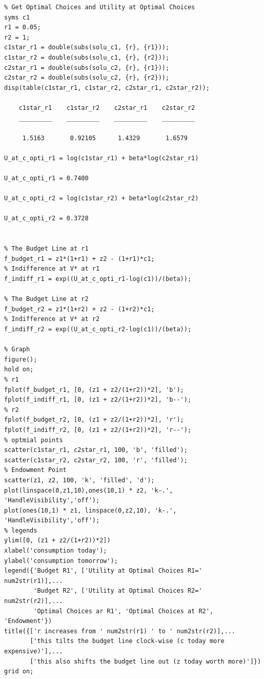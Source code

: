 \documentclass[
]{book}
\begin{document}
\begin{verbatim}
% Get Optimal Choices and Utility at Optimal Choices
syms c1
r1 = 0.05;
r2 = 1;
c1star_r1 = double(subs(solu_c1, {r}, {r1}));
c1star_r2 = double(subs(solu_c1, {r}, {r2}));
c2star_r1 = double(subs(solu_c2, {r}, {r1}));
c2star_r2 = double(subs(solu_c2, {r}, {r2}));
disp(table(c1star_r1, c1star_r2, c2star_r1, c2star_r2));

    c1star_r1    c1star_r2    c2star_r1    c2star_r2
    _________    _________    _________    _________

     1.5163       0.92105      1.4329       1.6579  

U_at_c_opti_r1 = log(c1star_r1) + beta*log(c2star_r1)

U_at_c_opti_r1 = 0.7400

U_at_c_opti_r2 = log(c1star_r2) + beta*log(c2star_r2)

U_at_c_opti_r2 = 0.3728


% The Budget Line at r1
f_budget_r1 = z1*(1+r1) + z2 - (1+r1)*c1;
% Indifference at V* at r1
f_indiff_r1 = exp((U_at_c_opti_r1-log(c1))/(beta));

% The Budget Line at r2
f_budget_r2 = z1*(1+r2) + z2 - (1+r2)*c1;
% Indifference at V* at r2
f_indiff_r2 = exp((U_at_c_opti_r2-log(c1))/(beta));

% Graph
figure();
hold on;
% r1
fplot(f_budget_r1, [0, (z1 + z2/(1+r2))*2], 'b');
fplot(f_indiff_r1, [0, (z1 + z2/(1+r2))*2], 'b--');
% r2
fplot(f_budget_r2, [0, (z1 + z2/(1+r2))*2], 'r');
fplot(f_indiff_r2, [0, (z1 + z2/(1+r2))*2], 'r--');
% optmial points
scatter(c1star_r1, c2star_r1, 100, 'b', 'filled');
scatter(c1star_r2, c2star_r2, 100, 'r', 'filled');
% Endowment Point
scatter(z1, z2, 100, 'k', 'filled', 'd');
plot(linspace(0,z1,10),ones(10,1) * z2, 'k-.', 'HandleVisibility','off');
plot(ones(10,1) * z1, linspace(0,z2,10), 'k-.', 'HandleVisibility','off');
% legends
ylim([0, (z1 + z2/(1+r2))*2])
xlabel('consumption today');
ylabel('consumption tomorrow');
legend({'Budget R1', ['Utility at Optimal Choices R1=' num2str(r1)],...
        'Budget R2', ['Utility at Optimal Choices R2=' num2str(r2)],...
        'Optimal Choices ar R1', 'Optimal Choices at R2', 'Endowment'})
title({['r increases from ' num2str(r1) ' to ' num2str(r2)],...
       ['this tilts the budget line clock-wise (c today more expensive)'],...
       ['this also shifts the budget line out (z today worth more)']}) 
grid on;
\end{verbatim}
\end{document}
